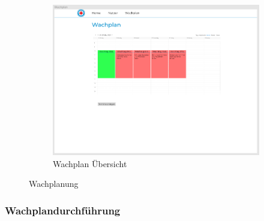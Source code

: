 \documentclass[fontsize=12pt,openright,oneside,paper=a4,BCOR=1cm]{scrbook}
\begin{document}
\begin{figure}[H]
\begin{subfigure}[b]{0.7\linewidth}
    \includegraphics[width=\linewidth]{Anlagen/Figma/13-WachplanuebersichtAngelegt.png}
    \caption{Wachplan Übersicht}
  \end{subfigure}
  \caption{Wachplanung}
  \label{fig:wachplan}
\end{figure}

\subsubsection{Wachplandurchführung}
\end{document}
